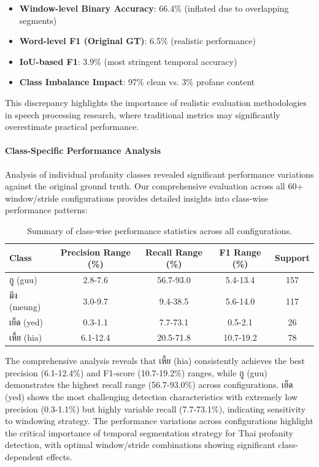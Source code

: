 \documentclass[11pt]{article}
\newcommand{\textthai}[1]{{\thaifont #1}}
\begin{document}
\begin{itemize}
    \item \textbf{Window-level Binary Accuracy}: 66.4\% (inflated due to overlapping segments)
    \item \textbf{Word-level F1 (Original GT)}: 6.5\% (realistic performance)
    \item \textbf{IoU-based F1}: 3.9\% (most stringent temporal accuracy)
    \item \textbf{Class Imbalance Impact}: 97\% clean vs. 3\% profane content
\end{itemize}

This discrepancy highlights the importance of realistic evaluation methodologies in speech processing research, where traditional metrics may significantly overestimate practical performance.

\paragraph{Class-Specific Performance Analysis}
Analysis of individual profanity classes revealed significant performance variations against the original ground truth. Our comprehensive evaluation across all 60+ window/stride configurations provides detailed insights into class-wise performance patterns:

\begin{table}[H]
    \caption{Summary of class-wise performance statistics across all configurations.}
    \centering
    \label{tab:class-performance-summary}
    \footnotesize
    \begin{tabular}{|l|c|c|c|c|}
        \hline
        \textbf{Class} & \textbf{Precision Range (\%)} & \textbf{Recall Range (\%)} & \textbf{F1 Range (\%)} & \textbf{Support} \\
        \hline
        \textthai{กู} (guu) & 2.8-7.6 & 56.7-93.0 & 5.4-13.4 & 157 \\
        \textthai{มึง} (meung) & 3.0-9.7 & 9.4-38.5 & 5.6-14.0 & 117 \\
        \textthai{เย็ด} (yed) & 0.3-1.1 & 7.7-73.1 & 0.5-2.1 & 26 \\
        \textthai{เหี้ย} (hia) & 6.1-12.4 & 20.5-71.8 & 10.7-19.2 & 78 \\
        \hline
    \end{tabular}
\end{table}

The comprehensive analysis reveals that \textthai{เหี้ย} (hia) consistently achieves the best precision (6.1-12.4\%) and F1-score (10.7-19.2\%) ranges, while \textthai{กู} (guu) demonstrates the highest recall range (56.7-93.0\%) across configurations. \textthai{เย็ด} (yed) shows the most challenging detection characteristics with extremely low precision (0.3-1.1\%) but highly variable recall (7.7-73.1\%), indicating sensitivity to windowing strategy. The performance variations across configurations highlight the critical importance of temporal segmentation strategy for Thai profanity detection, with optimal window/stride combinations showing significant class-dependent effects.
\end{document}
